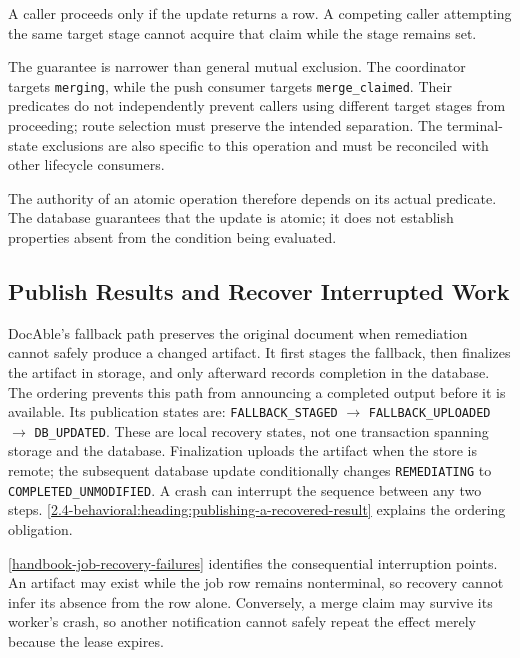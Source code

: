 
A caller proceeds only if the update returns a row. A competing caller attempting the same target stage cannot acquire that claim while the stage remains set.

The guarantee is narrower than general mutual exclusion. The coordinator targets \texttt{merging}, while the push consumer targets \texttt{merge\_claimed}. Their predicates do not independently prevent callers using different target stages from proceeding; route selection must preserve the intended separation. The terminal-state exclusions are also specific to this operation and must be reconciled with other lifecycle consumers.

The authority of an atomic operation therefore depends on its actual predicate. The database guarantees that the update is atomic; it does not establish properties absent from the condition being evaluated.

\subsection*{Publish Results and Recover Interrupted Work}


DocAble's fallback path preserves the original document when remediation cannot safely produce a changed artifact. It first stages the fallback, then finalizes the artifact in storage, and only afterward records completion in the database. The ordering prevents this path from announcing a completed output before it is available. Its publication states are:
\texttt{FALLBACK\_STAGED} \(\rightarrow\) \texttt{FALLBACK\_UPLOADED} \(\rightarrow\) \texttt{DB\_UPDATED}.
These are local recovery states, not one transaction spanning storage and the database. Finalization uploads the artifact when the store is remote; the subsequent database update conditionally changes \texttt{REMEDIATING} to \texttt{COMPLETED\_UNMODIFIED}. A crash can interrupt the sequence between any two steps. \autoref{2.4-behavioral:heading:publishing-a-recovered-result} explains the ordering obligation.

\autoref{handbook-job-recovery-failures} identifies the consequential interruption points. An artifact may exist while the job row remains nonterminal, so recovery cannot infer its absence from the row alone. Conversely, a merge claim may survive its worker's crash, so another notification cannot safely repeat the effect merely because the lease expires.

